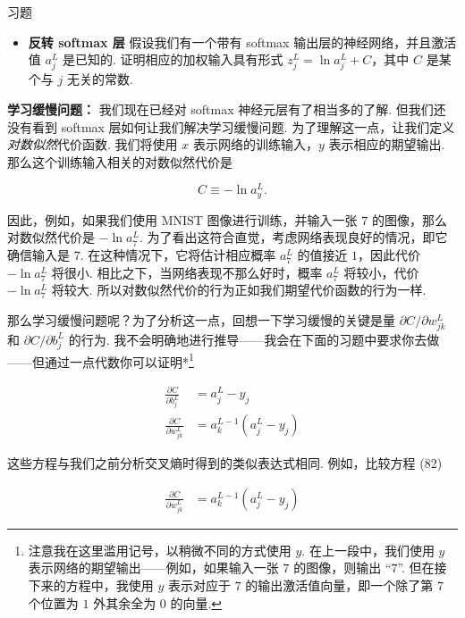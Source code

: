 \begin{exerciseBox}{习题}

\begin{itemize}

\item \textbf{反转 softmax 层} 假设我们有一个带有 softmax 输出层的神经网络，并且激活值 $a^L_j$ 是已知的. 证明相应的加权输入具有形式 $z^L_j = \ln a^L_j + C$，其中 $C$ 是某个与 $j$ 无关的常数.

\end{itemize}

\textbf{学习缓慢问题：} 我们现在已经对 softmax 神经元层有了相当多的了解. 但我们还没有看到 softmax 层如何让我们解决学习缓慢问题. 为了理解这一点，让我们定义\emph{对数似然}代价函数. 我们将使用 $x$ 表示网络的训练输入，$y$ 表示相应的期望输出. 那么这个训练输入相关的对数似然代价是

\begin{equation}
C \equiv -\ln a^L_y.
\tag{80}
\end{equation}

\noindent 因此，例如，如果我们使用 MNIST 图像进行训练，并输入一张 $7$ 的图像，那么对数似然代价是 $-\ln a^L_7$. 为了看出这符合直觉，考虑网络表现良好的情况，即它确信输入是 $7$. 在这种情况下，它将估计相应概率 $a^L_7$ 的值接近 $1$，因此代价 $-\ln a^L_7$ 将很小. 相比之下，当网络表现不那么好时，概率 $a^L_7$ 将较小，代价 $-\ln a^L_7$ 将较大. 所以对数似然代价的行为正如我们期望代价函数的行为一样.

那么学习缓慢问题呢？为了分析这一点，回想一下学习缓慢的关键是量 $\partial C / \partial w^L_{jk}$ 和 $\partial C / \partial b^L_j$ 的行为. 我不会明确地进行推导——我会在下面的习题中要求你去做——但通过一点代数你可以证明*\footnote{注意我在这里滥用记号，以稍微不同的方式使用 $y$. 在上一段中，我们使用 $y$ 表示网络的期望输出——例如，如果输入一张 $7$ 的图像，则输出 ``$7$''. 但在接下来的方程中，我使用 $y$ 表示对应于 $7$ 的输出激活值向量，即一个除了第 $7$ 个位置为 $1$ 外其余全为 $0$ 的向量.}

\begin{align}
\frac{\partial C}{\partial b^L_j} &= a^L_j-y_j \tag{81} \\ \frac{\partial C}{\partial w^L_{jk}} &= a^{L-1}_k (a^L_j-y_j) \tag{82}
\end{align}

\noindent 这些方程与我们之前分析交叉熵时得到的类似表达式相同. 例如，比较方程 (82)

\begin{align*}
\frac{\partial C}{\partial w^L_{jk}} &= a^{L-1}_k (a^L_j-y_j) \nonumber
\end{align*}


\end{exerciseBox}
